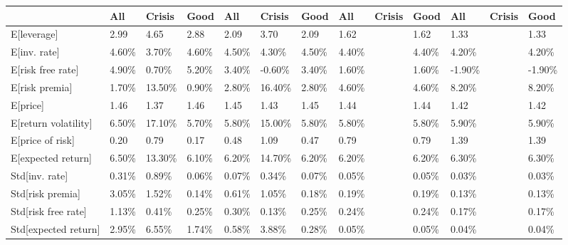 \documentclass{report}
\begin{document}
\begin{tabular}{lllllllllllll}
\toprule
{} &     All &  Crisis &    Good &    All &  Crisis &    Good &     All & Crisis &    Good &     All & Crisis &    Good \\
\midrule
E[leverage]                           &    2.99 &    4.65 &    2.88 &   2.09 &    3.70 &    2.09 &    1.62 &        &    1.62 &    1.33 &        &    1.33 \\
E[inv. rate]                          &   4.60\% &   3.70\% &   4.60\% &  4.50\% &   4.30\% &   4.50\% &   4.40\% &        &   4.40\% &   4.20\% &        &   4.20\% \\
E[risk free rate]                     &   4.90\% &   0.70\% &   5.20\% &  3.40\% &  -0.60\% &   3.40\% &   1.60\% &        &   1.60\% &  -1.90\% &        &  -1.90\% \\
E[risk premia]                        &   1.70\% &  13.50\% &   0.90\% &  2.80\% &  16.40\% &   2.80\% &   4.60\% &        &   4.60\% &   8.20\% &        &   8.20\% \\
E[price]                              &    1.46 &    1.37 &    1.46 &   1.45 &    1.43 &    1.45 &    1.44 &        &    1.44 &    1.42 &        &    1.42 \\
E[return volatility]                  &   6.50\% &  17.10\% &   5.70\% &  5.80\% &  15.00\% &   5.80\% &   5.80\% &        &   5.80\% &   5.90\% &        &   5.90\% \\
E[price of risk]                      &    0.20 &    0.79 &    0.17 &   0.48 &    1.09 &    0.47 &    0.79 &        &    0.79 &    1.39 &        &    1.39 \\
E[expected return]                    &   6.50\% &  13.30\% &   6.10\% &  6.20\% &  14.70\% &   6.20\% &   6.20\% &        &   6.20\% &   6.30\% &        &   6.30\% \\
Std[inv. rate]                        &   0.31\% &   0.89\% &   0.06\% &  0.07\% &   0.34\% &   0.07\% &   0.05\% &        &   0.05\% &   0.03\% &        &   0.03\% \\
Std[risk premia]                      &   3.05\% &   1.52\% &   0.14\% &  0.61\% &   1.05\% &   0.18\% &   0.19\% &        &   0.19\% &   0.13\% &        &   0.13\% \\
Std[risk free rate]                   &   1.13\% &   0.41\% &   0.25\% &  0.30\% &   0.13\% &   0.25\% &   0.24\% &        &   0.24\% &   0.17\% &        &   0.17\% \\
Std[expected return]                  &   2.95\% &   6.55\% &   1.74\% &  0.58\% &   3.88\% &   0.28\% &   0.05\% &        &   0.05\% &   0.04\% &        &   0.04\% \\

\end{tabular}
\end{document}
